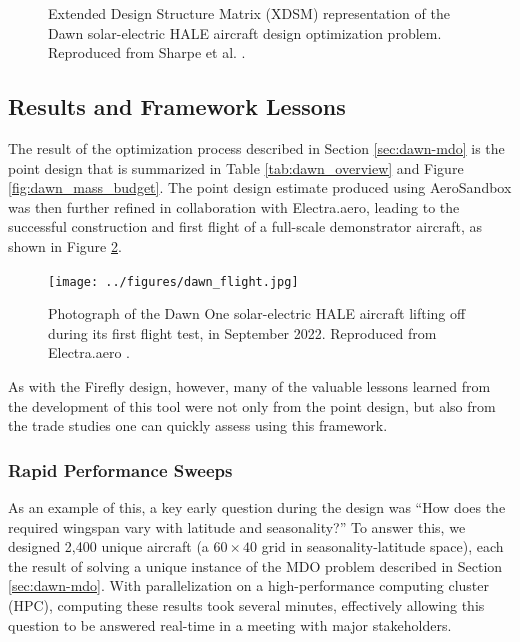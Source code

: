 \begin{figure}[H]
    \centering
    \begin{adjustbox}{width=\textwidth,center,trim={3.5in 0 0.25in 0}}
        
    \end{adjustbox}
    \caption{Extended Design Structure Matrix (XDSM) representation of the Dawn solar-electric HALE aircraft design optimization problem. Reproduced from Sharpe et al. \cite{sharpe_optimization_2021}.}
    \label{fig:dawn_xdsm}
\end{figure}

\subsection{Results and Framework Lessons}

The result of the optimization process described in Section \ref{sec:dawn-mdo} is the point design that is summarized in Table \ref{tab:dawn_overview} and Figure \ref{fig:dawn_mass_budget}. The point design estimate produced using AeroSandbox was then further refined in collaboration with Electra.aero, leading to the successful construction and first flight of a full-scale demonstrator aircraft, as shown in Figure \ref{fig:dawn_flight}.

\begin{figure}[H]
    \centering
    \texttt{[image: ../figures/dawn\_flight.jpg]}
    \caption{Photograph of the Dawn One solar-electric HALE aircraft lifting off during its first flight test, in September 2022. Reproduced from Electra.aero \cite{electra_dawn_flight}.}
    \label{fig:dawn_flight}
\end{figure}

As with the Firefly design, however, many of the valuable lessons learned from the development of this tool were not only from the point design, but also from the trade studies one can quickly assess using this framework.

\subsubsection*{Rapid Performance Sweeps}

As an example of this, a key early question during the design was ``How does the required wingspan vary with latitude and seasonality?'' To answer this, we designed 2,400 unique aircraft (a $60\times40$ grid in seasonality-latitude space), each the result of solving a unique instance of the MDO problem described in Section \ref{sec:dawn-mdo}. With parallelization on a high-performance computing cluster (HPC), computing these results took several minutes, effectively allowing this question to be answered real-time in a meeting with major stakeholders.

